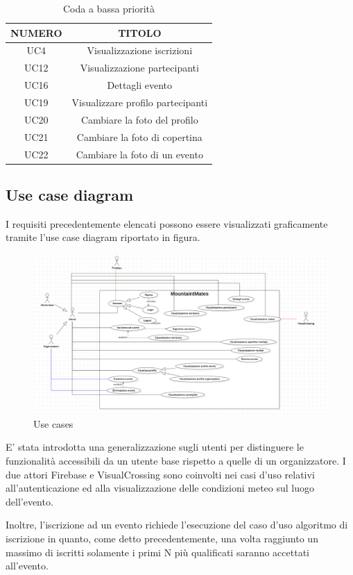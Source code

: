 \begin{table}
\begin{center}
\begin{tabular}{ |c|c|}
 \hline
 \textbf{NUMERO}& \textbf{TITOLO} \\ \hline
 UC4& Visualizzazione iscrizioni\\ \hline
 UC12& Visualizzazione partecipanti\\ \hline
 UC16& Dettagli evento\\ \hline
 UC19& Visualizzare profilo partecipanti\\ \hline
 UC20& Cambiare la foto del profilo\\ \hline
 UC21& Cambiare la foto di copertina\\ \hline
 UC22& Cambiare la foto di un evento\\ \hline
\end{tabular}
  \caption{Coda a bassa priorità}
  \label{tab: bassa-priorità}
\end{center}
\end{table}

\clearpage
\subsection{Use case diagram}
I requisiti precedentemente elencati possono essere visualizzati graficamente tramite l'use case diagram riportato in figura.

\begin{figure}[ht!]
    \centering
    \includegraphics[scale=0.55]{immagini/UseCases.png}
    \caption{Use cases}
    \label{fig: usecases}
  \end{figure}

E' stata introdotta una generalizzazione sugli utenti per distinguere le funzionalità accessibili da un utente base
rispetto a quelle di un organizzatore.
I due attori Firebase e VisualCrossing sono coinvolti nei casi d'uso relativi all'autenticazione ed alla visualizzazione delle
condizioni meteo sul luogo dell'evento.

Inoltre, l'iscrizione ad un evento richiede l'esecuzione del caso d'uso algoritmo di iscrizione in quanto, come detto precedentemente,
una volta raggiunto un massimo di iscritti solamente i primi N più qualificati saranno accettati all'evento.